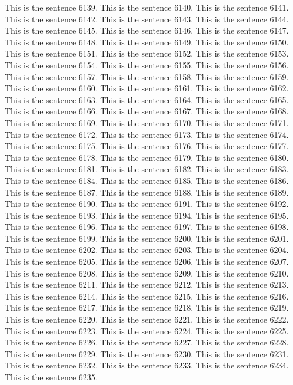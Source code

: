 \documentclass{article}
\begin{document}
This is the sentence 6139.
This is the sentence 6140.
This is the sentence 6141.
This is the sentence 6142.
This is the sentence 6143.
This is the sentence 6144.
This is the sentence 6145.
This is the sentence 6146.
This is the sentence 6147.
This is the sentence 6148.
This is the sentence 6149.
This is the sentence 6150.
This is the sentence 6151.
This is the sentence 6152.
This is the sentence 6153.
This is the sentence 6154.
This is the sentence 6155.
This is the sentence 6156.
This is the sentence 6157.
This is the sentence 6158.
This is the sentence 6159.
This is the sentence 6160.
This is the sentence 6161.
This is the sentence 6162.
This is the sentence 6163.
This is the sentence 6164.
This is the sentence 6165.
This is the sentence 6166.
This is the sentence 6167.
This is the sentence 6168.
This is the sentence 6169.
This is the sentence 6170.
This is the sentence 6171.
This is the sentence 6172.
This is the sentence 6173.
This is the sentence 6174.
This is the sentence 6175.
This is the sentence 6176.
This is the sentence 6177.
This is the sentence 6178.
This is the sentence 6179.
This is the sentence 6180.
This is the sentence 6181.
This is the sentence 6182.
This is the sentence 6183.
This is the sentence 6184.
This is the sentence 6185.
This is the sentence 6186.
This is the sentence 6187.
This is the sentence 6188.
This is the sentence 6189.
This is the sentence 6190.
This is the sentence 6191.
This is the sentence 6192.
This is the sentence 6193.
This is the sentence 6194.
This is the sentence 6195.
This is the sentence 6196.
This is the sentence 6197.
This is the sentence 6198.
This is the sentence 6199.
This is the sentence 6200.
This is the sentence 6201.
This is the sentence 6202.
This is the sentence 6203.
This is the sentence 6204.
This is the sentence 6205.
This is the sentence 6206.
This is the sentence 6207.
This is the sentence 6208.
This is the sentence 6209.
This is the sentence 6210.
This is the sentence 6211.
This is the sentence 6212.
This is the sentence 6213.
This is the sentence 6214.
This is the sentence 6215.
This is the sentence 6216.
This is the sentence 6217.
This is the sentence 6218.
This is the sentence 6219.
This is the sentence 6220.
This is the sentence 6221.
This is the sentence 6222.
This is the sentence 6223.
This is the sentence 6224.
This is the sentence 6225.
This is the sentence 6226.
This is the sentence 6227.
This is the sentence 6228.
This is the sentence 6229.
This is the sentence 6230.
This is the sentence 6231.
This is the sentence 6232.
This is the sentence 6233.
This is the sentence 6234.
This is the sentence 6235.
\end{document}

